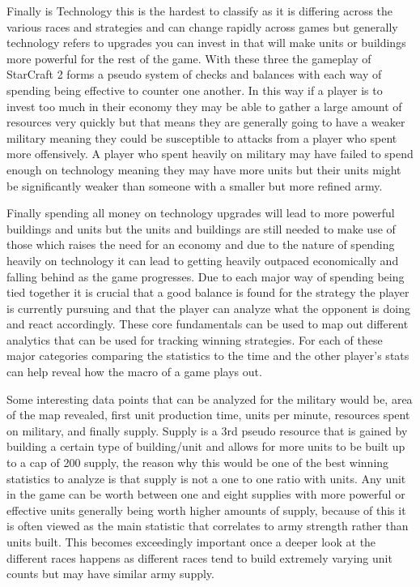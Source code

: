 \documentclass[a4paper,12pt]{report}
\begin{document}
Finally is Technology this is the hardest to classify as it is differing across the various races and strategies and can change rapidly across games but generally technology refers to upgrades you can invest in that will make units or buildings more powerful for the rest of the game. With these three the gameplay of StarCraft 2 forms a pseudo system of checks and balances with each way of spending being effective to counter one another. In this way if a player is to invest too much in their economy they may be able to gather a large amount of resources very quickly but that means they are generally going to have a weaker military meaning they could be susceptible to attacks from a player who spent more offensively. A player who spent heavily on military may have failed to spend enough on technology meaning they may have more units but their units might be significantly weaker than someone with a smaller but more refined army.

Finally spending all money on technology upgrades will lead to more powerful buildings and units but the units and buildings are still needed to make use of those which raises the need for an economy and due to the nature of spending heavily on technology it can lead to getting heavily outpaced economically and falling behind as the game progresses. Due to each major way of spending being tied together it is crucial that a good balance is found for the strategy the player is currently pursuing and that the player can analyze what the opponent is doing and react accordingly. These core fundamentals can be used to map out different analytics that can be used for tracking winning strategies. For each of these major categories comparing the statistics to the time and the other player’s stats can help reveal how the macro of a game plays out.

Some interesting data points that can be analyzed for the military would be, area of the map revealed, first unit production time, units per minute, resources spent on military, and finally supply. Supply is a 3rd pseudo resource that is gained by building a certain type of building/unit and allows for more units to be built up to a cap of 200 supply, the reason why this would be one of the best winning statistics to analyze is that supply is not a one to one ratio with units. Any unit in the game can be worth between one and eight supplies with more powerful or effective units generally being worth higher amounts of supply, because of this it is often viewed as the main statistic that correlates to army strength rather than units built. This becomes exceedingly important once a deeper look at the different races happens as different races tend to build extremely varying unit counts but may have similar army supply.
\end{document}
